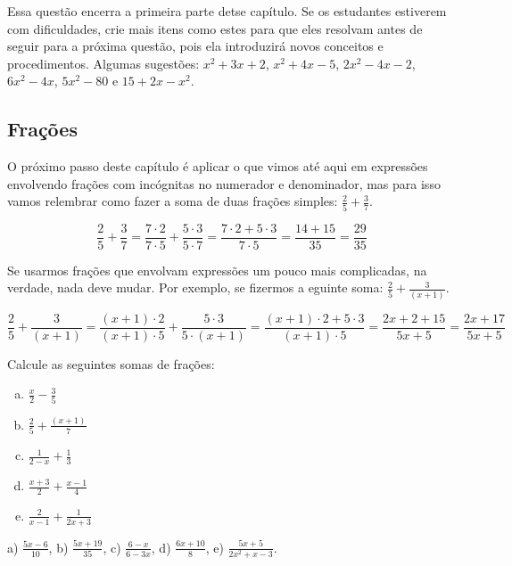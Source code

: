 \documentclass[main.tex]{subfiles}
\begin{document}
\paraTutores

Essa questão encerra a primeira parte detse capítulo. Se os estudantes estiverem com dificuldades, crie mais itens como estes para que eles resolvam antes de seguir para a próxima questão, pois ela introduzirá novos conceitos e procedimentos. Algumas sugestões: $x^2+3x+2$, $x^2+4x-5$, $2x^2-4x-2$, $6x^2-4x$, $5x^2-80$ e $15+2x-x^2$.

\paraAmbos

\subsection*{Frações}

O próximo passo deste capítulo é aplicar o que vimos até aqui em expressões envolvendo frações com incógnitas no numerador e denominador, mas para isso vamos relembrar como fazer a soma de duas frações simples: $\frac{2}{5}+\frac{3}{7}$.

$$
\frac{2}{5} + \frac{3}{7} = \frac{7 \cdot 2}{7 \cdot 5} + \frac{5 \cdot 3}{5 \cdot 7} = \frac{7 \cdot 2 + 5 \cdot 3}{7 \cdot 5} = \frac{14 + 15}{35} = \frac{29}{35}
$$

Se usarmos frações que envolvam expressões um pouco mais complicadas, na verdade, nada deve mudar. Por exemplo, se fizermos a eguinte soma: $\frac{2}{5}+\frac{3}{(x+1)}$.

$$
\frac{2}{5} + \frac{3}{(x+1)} = \frac{(x+1) \cdot 2}{(x+1) \cdot 5} + \frac{5 \cdot 3}{5 \cdot (x+1)} = \frac{(x+1) \cdot 2 + 5 \cdot 3}{(x+1) \cdot 5} = \frac{2x+2+15}{5x+5} = \frac{2x+17}{5x+5}
$$

\begin{questao}
Calcule as seguintes somas de frações:
\begin{enumerate}[a)]
\item $\frac{x}{2}-\frac{3}{5}$
\item $\frac{2}{5}+\frac{(x+1)}{7}$
\item $\frac{1}{2-x}+\frac{1}{3}$
\item $\frac{x+3}{2}+\frac{x-1}{4}$
\item $\frac{2}{x-1}+\frac{1}{2x+3}$
\end{enumerate}
\end{questao}

\begin{gabarito}
	\begin{gabaritoQuestao}
		a) $\frac{5x-6}{10}$, b) $\frac{5x+19}{35}$, c) $\frac{6-x}{6-3x}$, d) $\frac{6x+10}{8}$, e) $\frac{5x+5}{2x^2+x-3}$.
	\end{gabaritoQuestao}
\end{gabarito}
\end{document}
